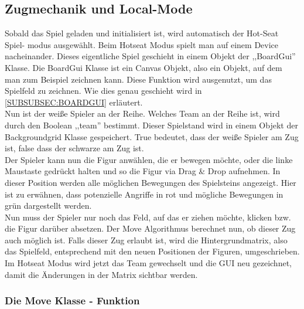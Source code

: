 \documentclass[12pt,a4paper]{article}
\begin{document}
\subsection{Zugmechanik und Local-Mode}
\label{SUBSEC:LOCAL_MODE}

Sobald das Spiel geladen und initialisiert ist, wird automatisch der Hot-Seat Spiel- modus ausgewählt. Beim Hotseat Modus spielt man auf einem Device nacheinander. Dieses eigentliche Spiel geschieht in einem Objekt der ,,BoardGui'' Klasse. Die BoardGui Klasse ist ein Canvas Objekt, also ein Objekt, auf dem man zum Beispiel zeichnen kann. Diese Funktion wird ausgenutzt, um das Spielfeld zu zeichnen. Wie dies genau geschieht wird in \ref{SUBSUBSEC:BOARDGUI}
erläutert.  \\
Nun ist der weiße Spieler an der Reihe. Welches Team an der Reihe ist, wird durch den Boolean ,,team'' bestimmt. Dieser Spielstand wird in einem Objekt der Backgroundgrid Klasse gespeichert. True bedeutet, dass der weiße Spieler am Zug ist, false dass der schwarze am Zug ist. \\
Der Spieler kann nun die Figur anwählen, die er bewegen möchte, oder die linke Maustaste gedrückt halten und so die Figur via Drag \& Drop aufnehmen. In dieser Position werden alle möglichen Bewegungen des Spielsteins angezeigt. Hier ist zu erwähnen, dass potenzielle Angriffe in rot und mögliche Bewegungen in grün dargestellt werden.\\
Nun muss der Spieler nur noch das Feld, auf das er ziehen möchte, klicken bzw. die Figur darüber absetzen. Der Move Algorithmus berechnet nun, ob dieser Zug auch möglich ist. Falls dieser Zug erlaubt ist, wird die Hintergrundmatrix, also das Spielfeld, entsprechend mit den neuen Positionen der Figuren, umgeschrieben. \\
Im Hotseat Modus wird jetzt das Team gewechselt und die GUI neu gezeichnet, damit die Änderungen in der Matrix sichtbar werden. 

\subsubsection{Die Move Klasse - Funktion}
\label{SUBSUBSEC:MOVE}
\end{document}
